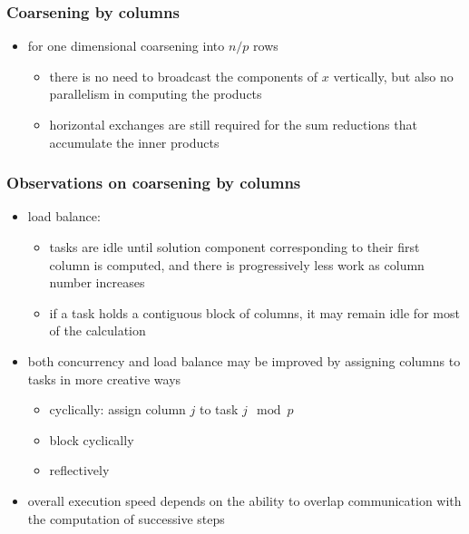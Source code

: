\begin{frame}[fragile]
%
  \frametitle{Coarsening by columns}
%
  \begin{itemize}
%
  \item for one dimensional coarsening into $n/p$ rows
    \begin{itemize}
    \item there is no need to broadcast the components of $x$ vertically, but also no
      parallelism in computing the products
    \item horizontal exchanges are still required for the sum reductions that accumulate the
      inner products
    \end{itemize}
%
  \begin{center}
    \begin{minipage}{.85\linewidth}
      \begin{algorithm}[H]
%
        \DontPrintSemicolon
        \NoCaptionOfAlgo
        \SetAlCapHSkip{0ex}
%
% 
      \end{algorithm}
    \end{minipage}
  \end{center}
%
  \end{itemize}
%
\end{frame}

\begin{frame}[fragile]
%
  \frametitle{Observations on coarsening by columns}
%
  \begin{itemize}
%
%
  \item load balance:
    \begin{itemize}
    \item tasks are idle until solution component corresponding to their first column is
      computed, and there is progressively less work as column number increases
    \item if a task holds a contiguous block of columns, it may remain idle for most of the
      calculation
    \end{itemize}
%
  \item both concurrency and load balance may be improved by assigning columns to tasks in more
    creative ways
    \begin{itemize}
    \item cyclically: assign column $j$ to task $j \mod p$
    \item block cyclically
    \item reflectively
    \end{itemize}
%
  \item overall execution speed depends on the ability to overlap communication with the
    computation of successive steps
%
  \end{itemize}
%
\end{frame}

